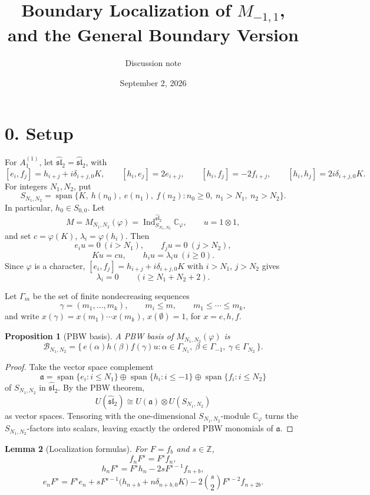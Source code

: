 \documentclass[11pt]{article}
\title{Boundary Localization of \(M_{-1,1}\), and the General Boundary Version}
\author{Discussion note}
\date{September 2, 2026}
\newcommand{\C}{\mathbb C}
\newcommand{\Z}{\mathbb Z}
\newcommand{\G}{\Gamma}
\newcommand{\slh}{\widehat{\mathfrak{sl}}_2}
\newcommand{\Ind}{\operatorname{Ind}}
\theoremstyle{plain}
\newtheorem{lemma}{Lemma}
\newtheorem{proposition}[lemma]{Proposition}
\theoremstyle{remark}
\begin{document}
\maketitle

\section*{0. Setup}

For \(A_1^{(1)}\), let \(\slh=\widehat{\mathfrak{sl}}_2\), with
\[
  [e_i,f_j]=h_{i+j}+i\delta_{i+j,0}K,\qquad
  [h_i,e_j]=2e_{i+j},\qquad
  [h_i,f_j]=-2f_{i+j},\qquad
  [h_i,h_j]=2i\delta_{i+j,0}K.
\]
For integers \(N_1,N_2\), put
\[
  S_{N_1,N_2}
  =
  \operatorname{span}\{K,\ h(n_0),\ e(n_1),\ f(n_2):
  n_0\ge0,\ n_1>N_1,\ n_2>N_2\}.
\]
In particular, \(h_0\in S_{0,0}\). Let
\[
  M=M_{N_1,N_2}(\varphi)=\Ind_{S_{N_1,N_2}}^{\slh}\C_\varphi,
  \qquad
  u=1\otimes1,
\]
and set \(c=\varphi(K)\), \(\lambda_i=\varphi(h_i)\). Then
\[
  e_iu=0\ (i>N_1),\qquad f_ju=0\ (j>N_2),
\]
\[
  Ku=cu,\qquad h_iu=\lambda_iu\ (i\ge0).
\]
Since \(\varphi\) is a character, \([e_i,f_j]=h_{i+j}+i\delta_{i+j,0}K\) with \(i>N_1\),
\(j>N_2\) gives
\[
  \lambda_i=0\qquad(i\ge N_1+N_2+2).
\]

Let \(\G_m\) be the set of finite nondecreasing sequences
\[
  \gamma=(m_1,\ldots,m_k),\qquad m_i\le m,\qquad m_1\le\cdots\le m_k,
\]
and write \(x(\gamma)=x(m_1)\cdots x(m_k)\), \(x(\emptyset)=1\), for \(x=e,h,f\).

\begin{proposition}[PBW basis]\label{prop:pbw}
A PBW basis of \(M_{N_1,N_2}(\varphi)\) is
\[
  \mathcal B_{N_1,N_2}
  =
  \{\,
    e(\alpha)h(\beta)f(\gamma)u:
    \alpha\in\G_{N_1},\ \beta\in\G_{-1},\ \gamma\in\G_{N_2}
  \,\}.
\]
\end{proposition}

\begin{proof}
Take the vector space complement
\[
  \mathfrak a
  =
  \operatorname{span}\{e_i:i\le N_1\}
  \oplus
  \operatorname{span}\{h_i:i\le -1\}
  \oplus
  \operatorname{span}\{f_i:i\le N_2\}
\]
of \(S_{N_1,N_2}\) in \(\slh\). By the PBW theorem,
\[
  U(\slh)\cong U(\mathfrak a)\otimes U(S_{N_1,N_2})
\]
as vector spaces. Tensoring with the one-dimensional \(S_{N_1,N_2}\)-module
\(\C_\varphi\) turns the \(S_{N_1,N_2}\)-factors into scalars, leaving exactly the
ordered PBW monomials of \(\mathfrak a\).
\end{proof}

\begin{lemma}[Localization formulas]\label{lem:loc}
For \(F=f_b\) and \(s\in\Z\),
\[
  f_nF^s=F^sf_n,
\]
\[
  h_nF^s=F^sh_n-2sF^{s-1}f_{n+b},
\]
\[
  e_nF^s
  =
  F^se_n
  +sF^{s-1}\bigl(h_{n+b}+n\delta_{n+b,0}K\bigr)
  -2\binom{s}{2}F^{s-2}f_{n+2b}.
\]
\end{lemma}
\end{document}
